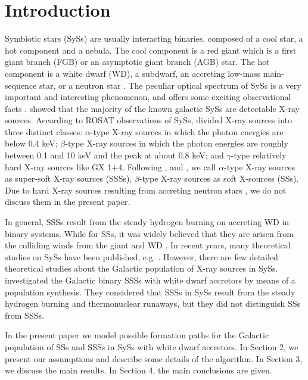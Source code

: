 \documentclass{elsart}
\begin{document}
\section{Introduction}
\label{intro} Symbiotic stars (SySs) are usually interacting
binaries, composed of a cool star, a hot component and a nebula. The
cool component is a red giant which is a first giant branch (FGB) or
an asymptotic giant branch (AGB) star. The hot component is a white
dwarf (WD), a subdwarf, an accreting low-mass main-sequence star, or
a neutron star \citep{kw84,mur91}. The peculiar optical spectrum of
SySs is a very important and interesting phenomenon, and offers some
exciting observational facts \citep{k86,ms99,b00,m03}. \citet{mur97}
showed that the majority of the known galactic SySs are detectable
X-ray sources. According to ROSAT observations of SySs, \cite{mur97}
divided X-ray sources into three distinct classes: $\alpha$-type
X-ray sources in which the photon energies are below 0.4 keV;
$\beta$-type X-ray sources in which the photon energies are roughly
between 0.1 and 10 keV and the peak at about 0.8 keV; and
$\gamma$-type relatively hard X-ray sources like GX 1+4. Following
\cite{v92}, \cite{yun96} and \cite{mur97}, we call $\alpha$-type
X-ray sources as super-soft X-ray sources (SSSs), $\beta$-type X-ray
sources as soft X-sources (SSs)\citep{mur97}. Due to hard X-ray
sources resulting from accreting neutron stars
\citep{v92,mur97,o07}, we do not discuss them in the present paper.


In general, SSSs result from the steady hydrogen burning on
accreting WD in binary systems. While for SSs, it was widely
believed that they are arisen from the colliding winds from the
giant and WD \citep{l95,mur97}. In recent years, many theoretical
studies on SySs have been published, e.g.
\citet{yun95,h95a,it96,h02,lu06,lu07,lu08}. However, there are few
detailed theoretical studies about the Galactic population of X-ray
sources in SySs. \cite{yun96} investigated the Galactic binary SSSs
with white dwarf accretors by means of a population synthesis. They
considered that SSSs in SySs result from the steady hydrogen burning
and thermonuclear runaways, but they did not distinguish SSs from
SSSs.

In the present paper we model possible formation paths for the
Galactic population of SSs and SSSs in SySs with white dwarf
accretors.  In Section 2, we present our assumptions and describe
some details of the algorithm. In Section 3, we discuss the main
results. In Section 4, the main conclusions are given.
\end{document}
